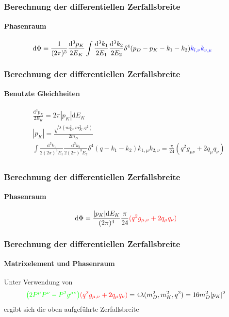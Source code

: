 \documentclass[hyperref={pdfpagelabels=false}]{beamer}
\begin{document}
\begin{frame}
   \frametitle{Berechnung der differentiellen Zerfallsbreite}
  \framesubtitle{Phasenraum}
   \begin{align*}
  \mathrm{d} \Phi & = \frac{1}{(2\pi)^5}\frac{\mathrm{d}^3p_K}{2E_K} \int \frac{\mathrm{d}^3k_1}{2E_1} \frac{\mathrm{d}^3k_2}{2E_2}\delta^4(p_D-p_K-k_1-k_2)\color{blue}{k_{l,\nu}k_{\nu,\mu}}
 \end{align*}
\end{frame}

\begin{frame}
    \frametitle{Berechnung der differentiellen Zerfallsbreite}
  \framesubtitle{Benutzte Gleichheiten}
\begin{align*}
 & \frac{\mathrm{d}^3p_K}{2E_K} = 2\pi |p_K|\mathrm{d}E_K\\
&|p_K| = \frac{\sqrt{\lambda(m_D^2, m_K^2, q^2)}}{2m_D}\\
&\int \frac{\mathrm{d}^3k_1}{2(2\pi)^3E_1} \frac{\mathrm{d}^3k_2}{2(2\pi)^3E_2}\delta^4(q-k_1-k_2)k_{1,\mu} k_{2,\nu} = \frac{\pi}{24}(q^2g_{\mu\nu} + 2q_\mu q_\nu)\\
\end{align*}
  
\end{frame}

\begin{frame}
     \frametitle{Berechnung der differentiellen Zerfallsbreite}
  \framesubtitle{Phasenraum}
  \begin{align*}
   \mathrm{d}\Phi = \frac{|p_K|\mathrm{d}E_K}{(2\pi)^4}\frac{\pi}{24}\color{red}{(q^2 g_{\mu,\nu}+2q_\mu q_\nu)}
  \end{align*}

\end{frame}

\begin{frame}
     \frametitle{Berechnung der differentiellen Zerfallsbreite}
  \framesubtitle{Matrixelement und Phasenraum}
  Unter Verwendung von 
  \begin{align*}
  \color{green}{\big(2P^\mu P^\nu - P^2 g^{\mu\nu}\big)}\color{red}{(q^2 g_{\mu,\nu}+2q_\mu q_\nu)}\color{black} = 4 \lambda(m_D^2,m_K^2,q^2) = 16 m_D^2 |p_K|^2
  \end{align*}
  ergibt sich die oben aufgeführte Zerfallsbreite
  
\end{frame}
\end{document}
